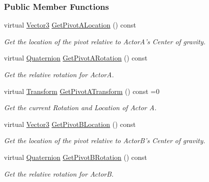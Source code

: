 \subsubsection*{Public Member Functions}
\begin{DoxyCompactItemize}
\item 
virtual \hyperlink{classMezzanine_1_1Vector3}{Vector3} \hyperlink{classMezzanine_1_1DualTransformConstraint_ad79b92cb1faeba6e7ba7123e02d86dc1}{GetPivotALocation} () const 
\begin{DoxyCompactList}\small\item\em Get the location of the pivot relative to ActorA's Center of gravity. \item\end{DoxyCompactList}\item 
virtual \hyperlink{classMezzanine_1_1Quaternion}{Quaternion} \hyperlink{classMezzanine_1_1DualTransformConstraint_ac3f2449bc4c0ccd959f4c67216246832}{GetPivotARotation} () const 
\begin{DoxyCompactList}\small\item\em Get the relative rotation for ActorA. \item\end{DoxyCompactList}\item 
virtual \hyperlink{classMezzanine_1_1Transform}{Transform} \hyperlink{classMezzanine_1_1DualTransformConstraint_ac6798a2ea8e80e38fbfbf17df6043265}{GetPivotATransform} () const =0
\begin{DoxyCompactList}\small\item\em Get the current Rotation and Location of Actor A. \item\end{DoxyCompactList}\item 
virtual \hyperlink{classMezzanine_1_1Vector3}{Vector3} \hyperlink{classMezzanine_1_1DualTransformConstraint_ade678f85e0e32b5bf59778130e9d1730}{GetPivotBLocation} () const 
\begin{DoxyCompactList}\small\item\em Get the location of the pivot relative to ActorB's Center of gravity. \item\end{DoxyCompactList}\item 
virtual \hyperlink{classMezzanine_1_1Quaternion}{Quaternion} \hyperlink{classMezzanine_1_1DualTransformConstraint_a56e30c94d128e4c13f449b9933f815fe}{GetPivotBRotation} () const 
\begin{DoxyCompactList}\small\item\em Get the relative rotation for ActorB. \item\end{DoxyCompactList}\item 

\end{DoxyCompactItemize}
